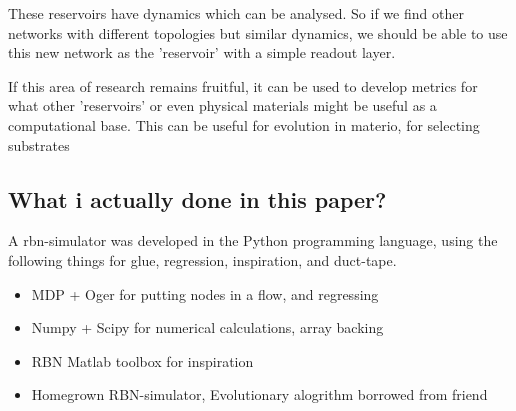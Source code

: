 
These reservoirs have dynamics which can be analysed.
So if we find other networks with different topologies but similar dynamics,
we should be able to use this new network as the 'reservoir' with a simple readout layer.

If this area of research remains fruitful,
it can be used to develop metrics for what other 'reservoirs' or even physical materials might be useful as a computational base.
This can be useful for evolution in materio, for selecting substrates \cite{evolutionInMaterio}

\subsection{What i actually done in this paper?}

A rbn-simulator was developed in the Python programming language,
using the following things for glue, regression, inspiration, and duct-tape.

\begin{itemize}
  \item MDP + Oger for putting nodes in a flow, and regressing
  \item Numpy + Scipy for numerical calculations, array backing
  \item RBN Matlab toolbox for inspiration
  \item Homegrown RBN-simulator, Evolutionary alogrithm borrowed from friend
\end{itemize}
